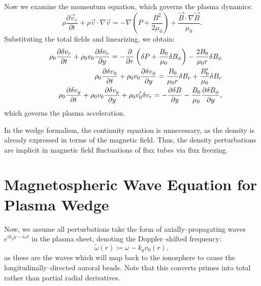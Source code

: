 \documentclass[a4paper,openany,12pt]{book}
\begin{document}
Now we examine the momentum equation, which governs the plasma dynamics:
\begin{equation}
\rho\frac{\partial\vec v_r}{\partial t}+\rho\vec v\cdot\nabla\vec v=-\nabla\left(P+\frac{B^2}{2\mu_0}\right)+\frac{\vec B\cdot\nabla\vec B}{\mu_0}.\label{E9.88}
\end{equation}
Substituting the total fields and linearizing, we obtain:
\begin{eqnarray}
&&\rho_0{\partial\delta v_r\over\partial t}+\rho_0 v_0{\partial\delta v_r\over\partial y}=-{\partial\over\partial r}\left(\delta P+{B_0\over\mu_0}\delta B_\phi\right)-{2B_0\over\mu_0r}\delta B_\phi\label{E9.89}\\
%
&&\rho_0{\partial\delta v_\phi\over\partial t}+\rho_0 v_0{\partial\delta v_\phi\over\partial y}={B_0\over\mu_0r}\delta B_r+{B'_0\over\mu_0}\delta B_r\label{E9.90}\\
%
&&\rho_0{\partial\delta v_y\over\partial t}+\rho_0 v_0{\partial\delta v_y\over\partial y}+\rho_0 v'_0\delta v_r= -{\partial\delta B\over\partial y}-\frac{B_0}{\mu_0}\frac{\partial\delta B_\phi}{\partial y},\label{E9.91}
\end{eqnarray}
which governs the plasma acceleration.

In the wedge formalism, the continuity equation is unnecessary, as the density is already expressed in terms of the magnetic field. Thus, the density perturbations are implicit in magnetic field fluctuations of flux tubes via flux freezing.

\section{Magnetospheric Wave Equation for Plasma Wedge}

Now, we assume all perturbations take the form of axially--propagating waves 
$e^{ik_yy-i\omega t}$ in the plasma sheet, denoting the Doppler--shifted frequency:
\begin{equation}
\widetilde\omega(r)\coloneqq\omega-k_y v_0(r),\label{E9.92}
\end{equation}
as these are the waves which will map back to the ionosphere to cause the longitudinally--directed auroral beads. Note that this converts primes into total rather than partial radial derivatives.
\end{document}
